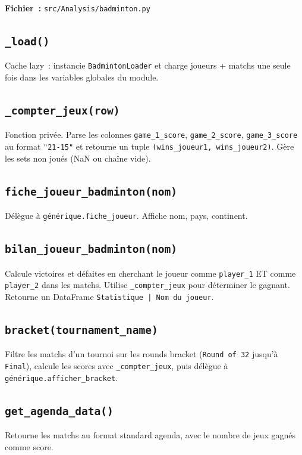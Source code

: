 \documentclass[12pt,a4paper]{article}
\begin{document}
\textbf{Fichier~:} \texttt{src/Analysis/badminton.py}

\subsection{\texttt{\_load()}}
Cache lazy~: instancie \texttt{BadmintonLoader} et charge joueurs + matchs
une seule fois dans les variables globales du module.

\subsection{\texttt{\_compter\_jeux(row)}}
Fonction privée. Parse les colonnes \texttt{game\_1\_score},
\texttt{game\_2\_score}, \texttt{game\_3\_score} au format \texttt{"21-15"}
et retourne un tuple \texttt{(wins\_joueur1, wins\_joueur2)}. Gère les sets
non joués (NaN ou chaîne vide).

\subsection{\texttt{fiche\_joueur\_badminton(nom)}}
Délègue à \texttt{générique.fiche\_joueur}. Affiche nom, pays, continent.

\subsection{\texttt{bilan\_joueur\_badminton(nom)}}
Calcule victoires et défaites en cherchant le joueur comme \texttt{player\_1}
ET comme \texttt{player\_2} dans les matchs. Utilise \texttt{\_compter\_jeux}
pour déterminer le gagnant. Retourne un DataFrame
\texttt{Statistique | Nom du joueur}.

\subsection{\texttt{bracket(tournament\_name)}}
Filtre les matchs d'un tournoi sur les rounds bracket (\texttt{Round of 32}
jusqu'à \texttt{Final}), calcule les scores avec \texttt{\_compter\_jeux},
puis délègue à \texttt{générique.afficher\_bracket}.

\subsection{\texttt{get\_agenda\_data()}}
Retourne les matchs au format standard agenda, avec le nombre de jeux gagnés
comme score.

\end{document}

